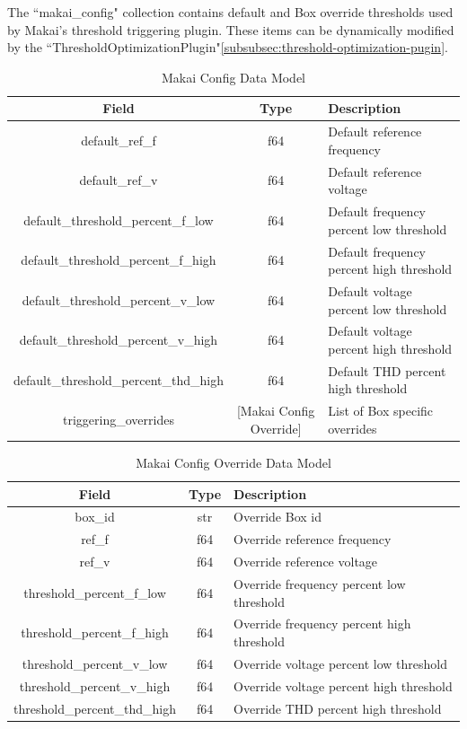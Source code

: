 The ``makai\_config" collection contains default and Box override thresholds used by Makai's threshold triggering plugin. These items can be dynamically modified by the ``ThresholdOptimizationPlugin"\ref{subsubsec:threshold-optimization-pugin}.

\begin{table}[H]
	\centering
	\caption{Makai Config Data Model}
	\begin{tabular}{|c|c|p{8cm}|}
		\hline
		Field & Type & Description \\
		\hline
		default\_ref\_f & f64 & Default reference frequency \\
		\hline
		default\_ref\_v & f64 & Default reference voltage \\
		\hline
		default\_threshold\_percent\_f\_low & f64 & Default frequency percent low threshold \\
		\hline
		default\_threshold\_percent\_f\_high & f64 & Default frequency percent high threshold \\
		\hline
		default\_threshold\_percent\_v\_low & f64 & Default voltage percent low threshold \\
		\hline
		default\_threshold\_percent\_v\_high & f64 & Default voltage percent high threshold \\
		\hline
		default\_threshold\_percent\_thd\_high & f64 & Default THD percent high threshold \\
		\hline
		triggering\_overrides & [Makai Config Override] & List of Box specific overrides \\
		\hline
	\end{tabular}
	\label{table:makai_config}
\end{table}

\begin{table}[H]
	\centering
	\caption{Makai Config Override Data Model}
	\begin{tabular}{|c|c|p{8cm}|}
		\hline
		Field & Type & Description \\
		\hline
		box\_id & str & Override Box id \\
		\hline
		ref\_f & f64 & Override reference frequency \\
		\hline
		ref\_v & f64 & Override reference voltage \\
		\hline
		threshold\_percent\_f\_low & f64 & Override frequency percent low threshold \\
		\hline
		threshold\_percent\_f\_high & f64 & Override frequency percent high threshold \\
		\hline
		threshold\_percent\_v\_low & f64 & Override voltage percent low threshold \\
		\hline
		threshold\_percent\_v\_high & f64 & Override voltage percent high threshold \\
		\hline
		threshold\_percent\_thd\_high & f64 & Override THD percent high threshold \\
		\hline
	\end{tabular}
	\label{table:makai_config_override}
\end{table}

